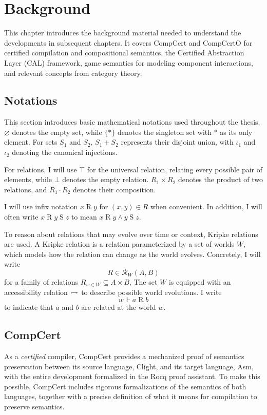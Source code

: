\chapter{Background}
\label{ch:bg}

This chapter introduces the background material
needed to understand the developments in subsequent chapters.
It covers CompCert and CompCertO for certified compilation and compositional semantics,
the Certified Abstraction Layer (CAL) framework,
game semantics for modeling component interactions,
and relevant concepts from category theory.

\section{Notations}

This section introduces basic mathematical notations
used throughout the thesis.
$\varnothing$ denotes the empty set,
while $\{*\}$ denotes the singleton set
with $*$ as its only element.
For sets $S_1$ and $S_2$,
$S_1 + S_2$ represents their disjoint union,
with $\iota_1$ and $\iota_2$ denoting the canonical injections.

For relations,
I will use $\top$ for the universal relation,
relating every possible pair of elements,
while $\bot$ denotes the empty relation.
$R_1 \times R_2$ denotes the product of two relations,
and $R_1 \cdot R_2$ denotes their composition.

I will use infix notation $x \mathrel{R} y$
for $(x, y) \in R$ when convenient.
In addition, I will often write $x \mathrel{R} y \mathrel{S} z$
to mean $x \mathrel{R} y \mathrel\wedge y \mathrel{S} z$.

To reason about relations
that may evolve over time or context,
Kripke relations are used.
A Kripke relation is a relation parameterized
by a set of worlds $W$,
which models how the relation can change as the world evolves.
Concretely, I will write
\[
  R \in \mathcal{R}_W(A, B)
\]
for a family of relations $R_{w \in W} \subseteq A \times B$,
The set $W$ is equipped with
an accessibility relation $\rightarrowtail$
to describe possible world evolutions. I write
\[
  w \Vdash a \mathbin{R} b
\]
to indicate that $a$ and $b$ are related at the world $w$.

\section{CompCert}

As a \emph{certified} compiler,
CompCert provides a mechanized proof of semantics preservation
between its source language, Clight,
and its target language, Asm,
with the entire development formalized
in the Rocq proof assistant.
To make this possible,
CompCert includes rigorous formalizations of
the semantics of both languages,
together with a precise definition of
what it means for compilation to preserve semantics.

